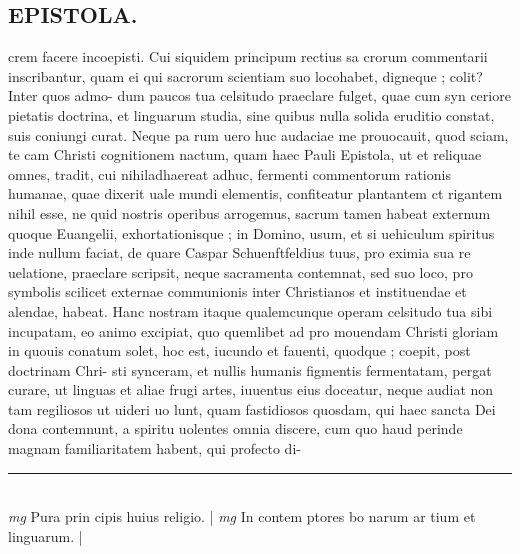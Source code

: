 \documentclass{article}
\begin{document}
\begin{pages}
\section*{EPISTOLA.  }\pstart crem facere incoepisti. Cui siquidem principum rectius sa crorum commentarii inscribantur, quam ei qui sacrorum scientiam suo locohabet, digneque ; colit? Inter quos admo- dum paucos tua celsitudo praeclare fulget, quae cum syn ceriore pietatis doctrina, et linguarum studia, sine quibus nulla solida eruditio constat, suis coniungi curat. Neque  pa rum uero huc audaciae me prouocauit, quod sciam, te cam Christi cognitionem nactum, quam haec Pauli Epistola, ut et reliquae omnes, tradit, cui nihiladhaereat adhuc, fermenti commentorum rationis humanae, quae dixerit uale mundi elementis, confiteatur plantantem ct rigantem nihil esse, ne quid nostris operibus arrogemus, sacrum tamen habeat externum quoque  Euangelii, exhortationisque ; in Domino, usum, et si uehiculum spiritus inde nullum faciat, de quare Caspar Schuenftfeldius tuus, pro eximia sua re uelatione, praeclare scripsit, neque  sacramenta contemnat, sed suo loco, pro symbolis scilicet externae communionis inter Christianos et instituendae et alendae, habeat.   \pend\pstart Hanc nostram itaque  qualemcunque operam celsitudo tua sibi incupatam, eo animo excipiat, quo quemlibet ad pro mouendam Christi gloriam in quouis conatum solet, hoc est, iucundo et fauenti, quodque ; coepit, post doctrinam Chri- sti synceram, et nullis humanis figmentis fermentatam, pergat curare, ut linguas et aliae frugi artes, iuuentus eius doceatur, neque  audiat non tam regiliosos ut uideri uo lunt, quam fastidiosos quosdam, qui haec sancta Dei dona contemnunt, a spiritu uolentes omnia discere, cum quo haud perinde magnam familiaritatem habent, qui profecto di-  \pend
\vspace{0.5cm}\noindent
\vspace{0.2cm}\rule{1cm}{0.2pt}\\ 
\hspace{0.2cm}\textit{mg}
\footnotesize Pura prin cipis huius religio.  
\normalsize| 
\hspace{0.2cm}\textit{mg}
\footnotesize In contem ptores bo narum ar tium et linguarum.  
\normalsize| 

\end{pages}
\end{document}
